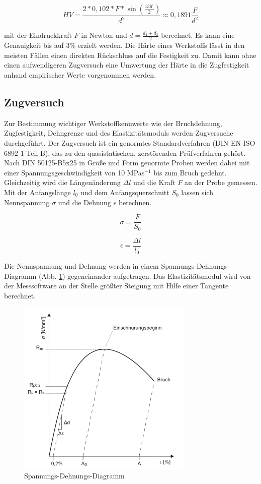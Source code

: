 $$HV=\frac {2*0,102*F*\sin \left( \frac{136^\circ}{2}\right) } {d^2} \approx 0,1891 \frac{F}{d^2}$$

mit der Eindruckkraft $F$ in Newton und $d=\frac {d_1 + d_2}{2} $ berechnet. Es kann eine Genauigkeit bis auf 3\% erzielt werden.  Die Härte eines Werkstoffs lässt in den meisten Fällen einen direkten Rückschluss auf die Festigkeit zu. Damit kann ohne einen aufwendigeren Zugversuch eine Umwertung der Härte in die Zugfestigkeit anhand empirischer Werte vorgenommen werden. 

\subsection*{Zugversuch}
Zur Bestimmung wichtiger Werkstoffkennwerte wie der Bruchdehnung, Zugfestigkeit, Dehngrenze und des Elastizitätsmoduls werden Zugversuche durchgeführt. Der Zugversuch ist ein genormtes Standardverfahren (DIN EN ISO 6892-1 Teil B), das zu den quasistatischen, zerstörenden Prüfverfahren gehört. Nach DIN 50125-B5x25 in Größe und Form genormte Proben werden dabei mit einer Spannungsgeschwindigkeit von 10 MPas$^{-1}$ bis zum Bruch gedehnt. Gleichzeitig wird die Längenänderung $\Delta l$ und die Kraft $F$ an der Probe gemessen. Mit der Anfangslänge $l_0$ und dem Anfangsquerschnitt $S_0$ lassen sich Nennspannung $\sigma$ und die Dehnung $\epsilon$ berechnen.

$$\sigma=\frac{F}{S_0}$$

$$\epsilon=\frac{\Delta l} {l_0}$$

Die Nennspannung und Dehnung werden in einem Spannungs-Dehnungs-Diagramm (Abb. \ref{fig:spandehn}) gegeneinander aufgetragen. Das Elastizitätsmodul wird von der Messsoftware an der Stelle größter Steigung mit Hilfe einer Tangente berechnet. 

\begin{figure}
	\centering
	\includegraphics[width=0.6\linewidth]{./Bilder/Spgs-Dehnungs-Kurve_Dehngrenze}
	\caption{Spannungs-Dehnungs-Diagramm}
	\label{fig:spandehn}
\end{figure} 


